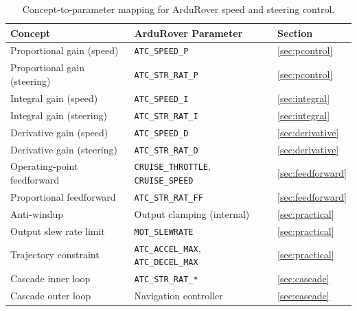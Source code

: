 \documentclass[../../book.tex]{subfiles}
\begin{document}
\begin{table}[htbp]
\centering
\caption{Concept-to-parameter mapping for ArduRover speed and steering control.}
\label{tab:summary}
\begin{tabular}{lll}
\toprule
Concept & ArduRover Parameter & Section \\
\midrule
Proportional gain (speed)    & \texttt{ATC\_SPEED\_P}                             & \cref{sec:pcontrol} \\
Proportional gain (steering) & \texttt{ATC\_STR\_RAT\_P}                          & \cref{sec:pcontrol} \\
Integral gain (speed)        & \texttt{ATC\_SPEED\_I}                             & \cref{sec:integral} \\
Integral gain (steering)     & \texttt{ATC\_STR\_RAT\_I}                          & \cref{sec:integral} \\
Derivative gain (speed)      & \texttt{ATC\_SPEED\_D}                             & \cref{sec:derivative} \\
Derivative gain (steering)   & \texttt{ATC\_STR\_RAT\_D}                          & \cref{sec:derivative} \\
Operating-point feedforward  & \texttt{CRUISE\_THROTTLE}, \texttt{CRUISE\_SPEED}  & \cref{sec:feedforward} \\
Proportional feedforward     & \texttt{ATC\_STR\_RAT\_FF}                         & \cref{sec:feedforward} \\
Anti-windup                  & Output clamping (internal)                         & \cref{sec:practical} \\
Output slew rate limit       & \texttt{MOT\_SLEWRATE}                             & \cref{sec:practical} \\
Trajectory constraint        & \texttt{ATC\_ACCEL\_MAX}, \texttt{ATC\_DECEL\_MAX} & \cref{sec:practical} \\
Cascade inner loop           & \texttt{ATC\_STR\_RAT\_*}                          & \cref{sec:cascade} \\
Cascade outer loop           & Navigation controller                              & \cref{sec:cascade} \\
\bottomrule
\end{tabular}
\end{table}
\end{document}
